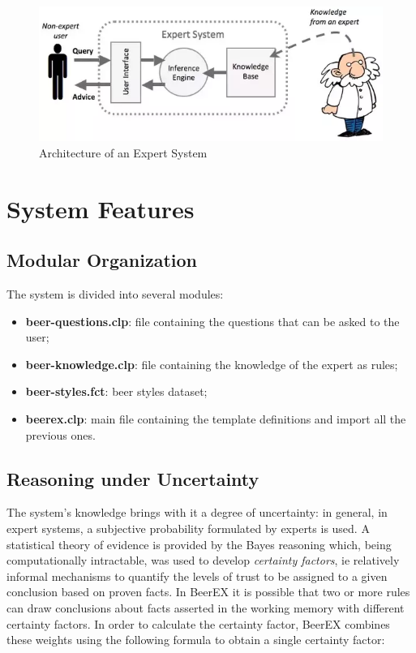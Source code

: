 \documentclass[12pt]{article}
\begin{document}
\begin{figure}[h]
\centering
\includegraphics[scale = 0.6]{img/arch.png}
\caption{Architecture of an Expert System}
\end{figure}

\section{System Features}

\subsection{Modular Organization}

The system is divided into several modules:
\begin{itemize}
\item \textbf{beer-questions.clp}: file containing the questions that can be asked to the user;
\item \textbf{beer-knowledge.clp}: file containing the knowledge of the expert as rules;
\item \textbf{beer-styles.fct}: beer styles dataset;
\item \textbf{beerex.clp}: main file containing the template definitions and import all the previous ones.
\end{itemize}

\subsection{Reasoning under Uncertainty}

The system's knowledge brings with it a degree of uncertainty: in general, in expert systems, a subjective probability formulated by experts is used. A statistical theory of evidence is provided by the Bayes reasoning which, being computationally intractable, was used to develop \textit{certainty factors}, ie relatively informal mechanisms to quantify the levels of trust to be assigned to a given conclusion based on proven facts. In BeerEX it is possible that two or more rules can draw conclusions about facts asserted in the working memory with different certainty factors. In order to calculate the certainty factor, BeerEX combines these weights using the following formula to obtain a single certainty factor:
\end{document}
